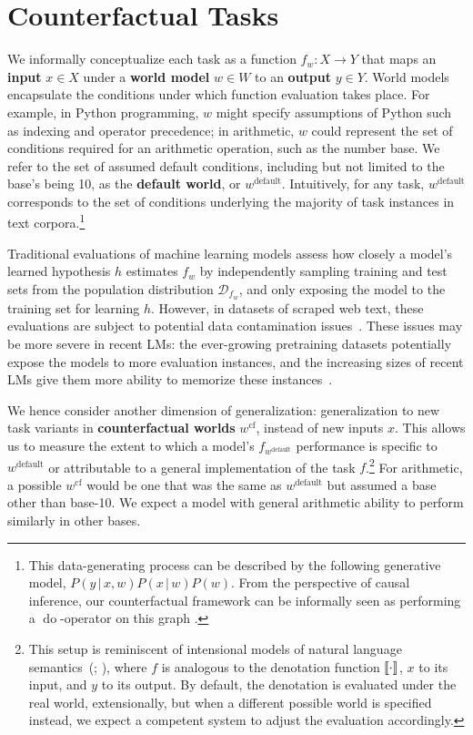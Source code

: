\section{Counterfactual Tasks} \label{sec:counterfactual-eval}

We informally conceptualize each task as a function $f_w : X \to Y $ that maps an \textbf{input} $x \in X$ under a \textbf{world model} $w \in W$ to an \textbf{output} $y \in Y$. World models encapsulate the conditions under which function evaluation takes place. For example, in Python programming, $w$ might specify assumptions of Python such as indexing and operator precedence; in arithmetic, $w$ could represent the set of conditions required for an arithmetic operation, such as the number base. 
We refer to the set of assumed default conditions, including but not limited to the base's being 10, as the \textbf{default world}, or $w^{\text{default}}$. Intuitively, for any task, $w^{\text{default}}$ corresponds to the set of conditions underlying the majority of task instances in text corpora.\footnote{This data-generating process can be described by the following generative model, $P(y \, | \, x, w)P(x \, | \, w)P(w)$. From the perspective of causal inference, our counterfactual framework can be informally seen as performing  a $\operatorname{do}$-operator on this graph \cite{pearl_2009}.}

Traditional evaluations of machine learning models assess how closely a model's learned hypothesis $h$ estimates $f_w$ by independently sampling training and test sets from the population distribution $\mathcal{D}_{f_{w}}$, and only exposing the model to the training set for learning $h$. However, 
in datasets of scraped web text, these
evaluations are subject to potential data contamination issues~.
These issues may be more severe in recent LMs: the ever-growing pretraining datasets potentially expose the models to more evaluation instances, and the increasing sizes of recent LMs give them more ability to memorize these instances~\citep{carlini21extracting,magar-schwartz-2022-data}.

We hence consider another dimension of generalization: generalization to new task variants in \textbf{counterfactual worlds} $w^\text{cf}$, instead of new inputs $x$.
This allows us to measure the extent to which a model's $f_{w^\text{default}}$ performance is specific to $w^{\text{default}}$ or attributable to a general implementation of the task $f$.\footnote{This setup is reminiscent of intensional models of natural language semantics~(\citealp[\S12]{kratzer1998semantics}; \citealp{von2011intensional}), where $f$ is analogous to the denotation function $\llbracket \cdot \rrbracket$, $x$ to its input, and $y$ to its output. By default, the denotation is evaluated under the real world, extensionally, but when a different possible world is specified instead, we expect a competent system to adjust the evaluation accordingly.} 
For arithmetic, a possible $w^{\text{cf}}$ would be one that was the same as $w^{\text{default}}$ but assumed a base other than base-10. We expect a model with general arithmetic ability to perform similarly in other bases.

